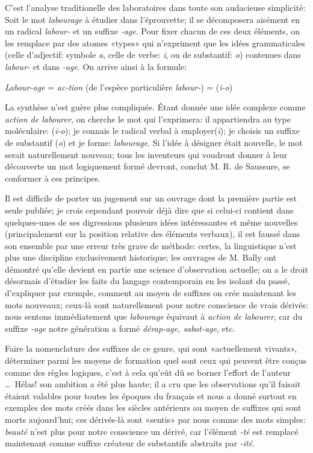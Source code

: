 \begin{appendices}
{C'est l'analyse traditionelle des laboratoires dans toute son
audacieuse simplicité: Soit le mot \emph{labourage} à étudier
dans l'éprouvette; il se décomposera aisément en un radical
\emph{labour-} et un suffixe \emph{-age}. Pour fixer chacun de ces
deux éléments, on les remplace par des atomes «types» qui
n'expriment que les idées grammaticales (celle d'adjectif: symbole
\emph{a}, celle de verbe: \emph{i}, ou de substantif: \emph{o})
contenues dans \emph{labour-} et dans \emph{-age}. On arrive ainsi à
la formule:


{\centering
  \emph{Labour-age} = \emph{ac-tion} (de l'espèce particulière
  \emph{labour-}) = (\emph{i-o})
\par}


La synthèse n'est guère plus compliquée. Étant donnée une
idée complexe comme \emph{action de labourer,} on cherche le mot qui
l'exprimera: il appartiendra au type moléculaire: (\emph{i-o}); je
connais le radical verbal à employer(\emph{i}); je choisis un
suffixe de substantif (\emph{o}) et je forme: \emph{labourage}. Si
l'idée à désigner était nouvelle, le mot serait naturellement
nouveau; tous les inventeurs qui voudront donner à leur découverte
un mot logiquement formé devront, conclut M. R. de Saussure, se
conformer à ces principes.

Il est difficile de porter un jugement sur un ouvrage dont la
première partie est seule publiée; je crois cependant pouvoir
déjà dire que si celui-ci contient dans quelques-unes de ses
digressions plusieurs idées intéressantes et même nouvelles
(principalement sur la position relative des éléments verbaux), il
est faussé dans son ensemble par une erreur très grave de
méthode: certes, la linguistique n'est plus une discipline
exclusivement historique; les ouvrages de M. Bally ont démontré
qu'elle devient en partie une science d'observation actuelle; on a le
droit désormais d'étudier les faits du langage contemporain en les
isolant du passé, d'expliquer par exemple, comment au moyen de
suffixes on crée maintenant les mots nouveaux; ceux-là sont
naturellement pour notre conscience de vrais dérivés: nous sentons
immédiatement que \emph{labourage} équivaut à \emph{action de
  labourer}, car du suffixe \emph{-age} notre génération a formé
\emph{dérap-age, sabot-age}, etc.

Faire la nomenclature des suffixes de ce genre, qui sont
«actuellement vivants», déterminer parmi les moyens de formation
quel sont  ceux qui peuvent être conçus comme des règles
logiques, c'est à cela qu'eût dû se borner l'effort de l'auteur
\ldots\ Hélas! son ambition a été plus haute; il a cru que les
observations qu'il faisait étaient valables pour toutes les
époques du français et nous a donné surtout en exemples des
mots créés dans les siècles antérieurs au moyen de suffixes
qui sont morts aujourd'hui; ces dérivés-là sont «sentis» par
nous comme des mots simples: \emph{beauté} n'est plus pour notre
conscience un dérivé, car l'élément \emph{-té} est remplacé
maintenant comme suffixe créateur de substantifs abstraits par
\emph{-ité}. 
}


\end{appendices}

